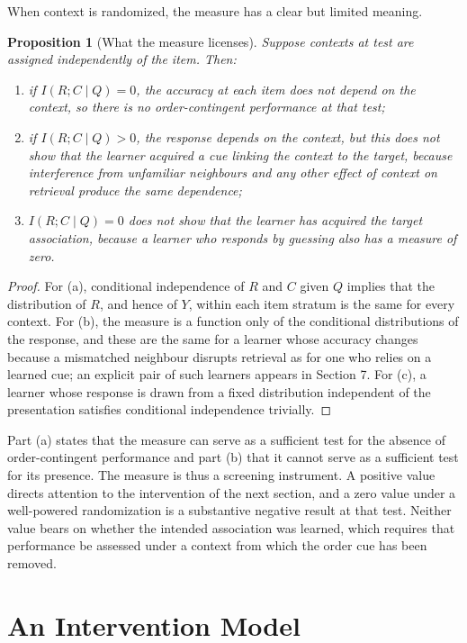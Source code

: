 \documentclass[11pt]{article}
\newtheorem{proposition}{Proposition}
\theoremstyle{remark}
\begin{document}
When context is randomized, the measure has a clear but limited meaning.

\begin{proposition}[What the measure licenses]
Suppose contexts at test are assigned independently of the item. Then:
\begin{enumerate}
\item[(a)] if $I(R;C\mid Q)=0$, the accuracy at each item does not depend on the context, so there is no order-contingent performance at that test;
\item[(b)] if $I(R;C\mid Q)>0$, the response depends on the context, but this does not show that the learner acquired a cue linking the context to the target, because interference from unfamiliar neighbours and any other effect of context on retrieval produce the same dependence;
\item[(c)] $I(R;C\mid Q)=0$ does not show that the learner has acquired the target association, because a learner who responds by guessing also has a measure of zero.
\end{enumerate}
\end{proposition}

\begin{proof}
For (a), conditional independence of $R$ and $C$ given $Q$ implies that the distribution of $R$, and hence of $Y$, within each item stratum is the same for every context. For (b), the measure is a function only of the conditional distributions of the response, and these are the same for a learner whose accuracy changes because a mismatched neighbour disrupts retrieval as for one who relies on a learned cue; an explicit pair of such learners appears in Section 7. For (c), a learner whose response is drawn from a fixed distribution independent of the presentation satisfies conditional independence trivially.
\end{proof}

Part (a) states that the measure can serve as a sufficient test for the absence of order-contingent performance and part (b) that it cannot serve as a sufficient test for its presence. The measure is thus a screening instrument. A positive value directs attention to the intervention of the next section, and a zero value under a well-powered randomization is a substantive negative result at that test. Neither value bears on whether the intended association was learned, which requires that performance be assessed under a context from which the order cue has been removed.

\section{An Intervention Model}
\end{document}
